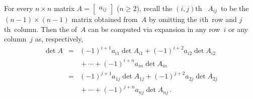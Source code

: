 \begin{theorem} \label{thm:letdet} 
For every \(n\times n\) matrix \(A=\begin{bmatrix} a_{ij} \end{bmatrix}\) (\(n\geq2\)), recall the \((i,j)\)th~ \(A_{ij}\)~to be the \((n-1)\times(n-1)\) matrix obtained from~\(A\) by omitting the \(i\)th~row and \(j\)th~column.  
Then the  of~\(A\) can be computed via expansion in any row~\(i\) or any column~\(j\) as, respectively,
\begin{eqnarray}
\det A
&=&(-1)^{i+1}a_{i1}\det A_{i1}
+(-1)^{i+2}a_{i2}\det A_{i2}
\nonumber\\&&{}
+\cdots+(-1)^{i+n}a_{in}\det A_{in}
\nonumber\\&=&(-1)^{j+1}a_{1j}\det A_{1j}
+(-1)^{j+2}a_{2j}\det A_{2j}
\nonumber\\&&{}
+\cdots+(-1)^{j+n}a_{nj}\det A_{nj}\,.
\label{eq:detlet}
\end{eqnarray}
\end{theorem}
